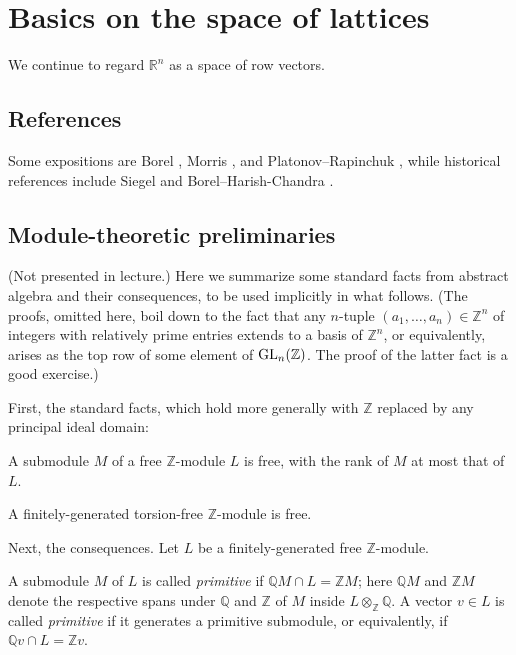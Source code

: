 \documentclass[reqno]{amsart} 
\begin{document}
\section{Basics on the space of lattices} \label{sec:org5af6785}

We continue to regard \(\mathbb{R}^n\) as a space of row vectors.


\subsection*{References}
Some expositions are Borel \cite{MR3970984}, Morris \cite{MR3307755}, and Platonov--Rapinchuk \cite{MR1278263}, while historical references include Siegel \cite{MR3003} and Borel--Harish-Chandra \cite{MR141670, MR147566}.


\subsection{Module-theoretic preliminaries} \label{sec:}
(Not presented in lecture.)  Here we summarize some standard facts from abstract algebra and their consequences, to be used implicitly in what follows.  (The proofs, omitted here, boil down to the fact that any $n$-tuple $(a_1,\dotsc,a_n)\in \mathbb{Z}^n$ of integers with relatively prime entries extends to a basis of $\mathbb{Z}^n$, or equivalently, arises as the top row of some element of $\operatorname{GL}_n(\mathbb{Z})$. The proof of the latter fact is a good exercise.)

First, the standard facts, which hold more generally with $\mathbb{Z}$ replaced by any principal ideal domain:

\begin{theorem}
  A submodule $M$ of a free $\mathbb{Z}$-module $L$ is free, with the rank of $M$ at most that of $L$.
\end{theorem}
\begin{theorem}\label{thm:torsion-free-implies-free}
  A finitely-generated torsion-free $\mathbb{Z}$-module is free.
\end{theorem}

Next, the consequences.  Let $L$ be a finitely-generated free $\mathbb{Z}$-module.

\begin{definition}
  \label{defn:}
  A submodule $M$ of $L$ is called \emph{primitive} if $\mathbb{Q} M \cap L = \mathbb{Z} M$; here $\mathbb{Q} M$ and $\mathbb{Z} M$ denote the respective spans under $\mathbb{Q}$ and $\mathbb{Z}$ of $M$ inside $L \otimes_{\mathbb{Z}} \mathbb{Q}$.  A vector $v \in L$ is called \emph{primitive} if it generates a primitive submodule, or equivalently, if $\mathbb{Q} v \cap L = \mathbb{Z} v$.
\end{definition}
\end{document}
